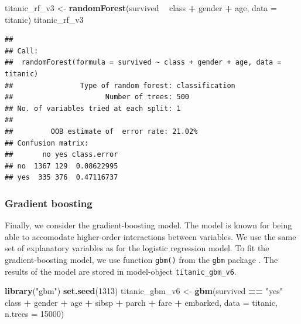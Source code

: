 \documentclass[12pt,]{krantz}
\newenvironment{Shaded}{\begin{snugshade}}{\end{snugshade}}
\newcommand{\DataTypeTok}[1]{\textcolor[rgb]{0.13,0.29,0.53}{#1}}
\newcommand{\DecValTok}[1]{\textcolor[rgb]{0.00,0.00,0.81}{#1}}
\newcommand{\KeywordTok}[1]{\textcolor[rgb]{0.13,0.29,0.53}{\textbf{#1}}}
\newcommand{\NormalTok}[1]{#1}
\newcommand{\OperatorTok}[1]{\textcolor[rgb]{0.81,0.36,0.00}{\textbf{#1}}}
\newcommand{\StringTok}[1]{\textcolor[rgb]{0.31,0.60,0.02}{#1}}
\begin{document}
\begin{Shaded}
\begin{Highlighting}[]
\NormalTok{titanic_rf_v3 <-}\StringTok{ }\KeywordTok{randomForest}\NormalTok{(survived }\OperatorTok{~}\StringTok{ }\NormalTok{class }\OperatorTok{+}\StringTok{ }\NormalTok{gender }\OperatorTok{+}\StringTok{ }\NormalTok{age, }\DataTypeTok{data =}\NormalTok{ titanic)}
\NormalTok{titanic_rf_v3}
\end{Highlighting}
\end{Shaded}

\begin{verbatim}
## 
## Call:
##  randomForest(formula = survived ~ class + gender + age, data = titanic) 
##                Type of random forest: classification
##                      Number of trees: 500
## No. of variables tried at each split: 1
## 
##         OOB estimate of  error rate: 21.02%
## Confusion matrix:
##       no yes class.error
## no  1367 129  0.08622995
## yes  335 376  0.47116737
\end{verbatim}

\hypertarget{model-titanic-gbm}{%
\subsubsection{Gradient boosting}\label{model-titanic-gbm}}

Finally, we consider the gradient-boosting model. \citep{Friedman00greedyfunction} The model is known for being able to accomodate higher-order interactions between variables. We use the same set of explanatory variables as for the logistic regression model. To fit the gradient-boosting model, we use function \texttt{gbm()} from the \texttt{gbm} package \citep{gbm}. The results of the model are stored in model-object \texttt{titanic\_gbm\_v6}.

\begin{Shaded}
\begin{Highlighting}[]
\KeywordTok{library}\NormalTok{(}\StringTok{"gbm"}\NormalTok{)}
\KeywordTok{set.seed}\NormalTok{(}\DecValTok{1313}\NormalTok{)}
\NormalTok{titanic_gbm_v6 <-}\StringTok{ }\KeywordTok{gbm}\NormalTok{(survived }\OperatorTok{==}\StringTok{ "yes"} \OperatorTok{~}\StringTok{ }\NormalTok{class }\OperatorTok{+}\StringTok{ }\NormalTok{gender }\OperatorTok{+}\StringTok{ }\NormalTok{age }\OperatorTok{+}\StringTok{ }\NormalTok{sibsp }\OperatorTok{+}\StringTok{ }\NormalTok{parch }\OperatorTok{+}\StringTok{ }\NormalTok{fare }\OperatorTok{+}\StringTok{ }\NormalTok{embarked, }
                      \DataTypeTok{data =}\NormalTok{ titanic, }\DataTypeTok{n.trees =} \DecValTok{15000}\NormalTok{)}
\end{Highlighting}
\end{Shaded}
\end{document}
